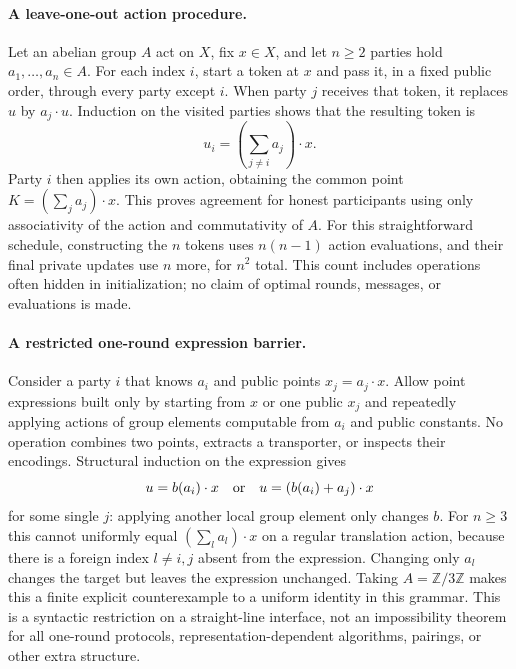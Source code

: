 \documentclass[11pt]{article}
\begin{document}
\paragraph{A leave-one-out action procedure.}
Let an abelian group $A$ act on $X$, fix $x\in X$, and let $n\ge2$ parties
hold $a_1,\ldots,a_n\in A$. For each index $i$, start a token at $x$ and
pass it, in a fixed public order, through every party except $i$.
When party $j$ receives that token, it replaces $u$ by $a_j\cdot u$.
Induction on the visited parties shows that the resulting token is
\[
u_i=\left(\sum_{j\ne i}a_j\right)\cdot x.
\]
Party $i$ then applies its own action, obtaining the common point
$K=(\sum_j a_j)\cdot x$. This proves agreement for honest participants
using only associativity of the action and commutativity of $A$.
For this straightforward schedule, constructing the $n$ tokens uses
$n(n-1)$ action evaluations, and their final private updates use $n$ more,
for $n^2$ total. This count includes operations often hidden in initialization;
no claim of optimal rounds, messages, or evaluations is made.

\paragraph{A restricted one-round expression barrier.}
Consider a party $i$ that knows $a_i$ and public points $x_j=a_j\cdot x$.
Allow point expressions built only by starting from $x$ or one public $x_j$
and repeatedly applying actions of group elements computable from $a_i$
and public constants. No operation combines two points, extracts a transporter,
or inspects their encodings. Structural induction on the expression gives
\[
u=b(a_i)\cdot x\quad\hbox{or}\quad
u=(b(a_i)+a_j)\cdot x
\]
for some single $j$: applying another local group element only changes $b$.
For $n\ge3$ this cannot uniformly equal $(\sum_l a_l)\cdot x$ on a regular
translation action, because there is a foreign index $l\ne i,j$ absent from
the expression. Changing only $a_l$ changes the target but leaves the
expression unchanged. Taking $A=\mathbb Z/3\mathbb Z$ makes this a finite
explicit counterexample to a uniform identity in this grammar.
This is a syntactic restriction on a straight-line interface, not an
impossibility theorem for all one-round protocols, representation-dependent
algorithms, pairings, or other extra structure.
\end{document}
